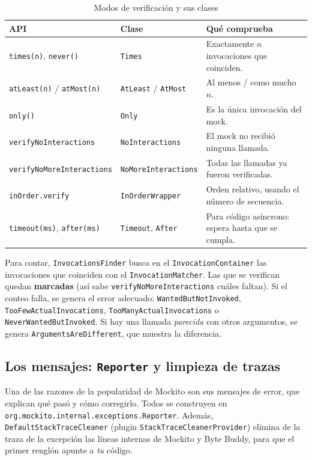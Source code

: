 \documentclass[11pt,a4paper,oneside]{report}
\newcommand{\code}[1]{\texttt{#1}}
\begin{document}
\begin{table}[H]
\centering
\caption{Modos de verificación y sus clases}
\begin{tabularx}{\linewidth}{llX}
\toprule
\textbf{API} & \textbf{Clase} & \textbf{Qué comprueba}\\
\midrule
\code{times(n)}, \code{never()} & \code{Times} & Exactamente $n$ invocaciones que coinciden.\\
\code{atLeast(n)} / \code{atMost(n)} & \code{AtLeast} / \code{AtMost} & Al menos / como mucho $n$.\\
\code{only()} & \code{Only} & Es la única invocación del mock.\\
\code{verifyNoInteractions} & \code{NoInteractions} & El mock no recibió ninguna llamada.\\
\code{verifyNoMoreInteractions} & \code{NoMoreInteractions} & Todas las llamadas ya fueron verificadas.\\
\code{inOrder.verify} & \code{InOrderWrapper} & Orden relativo, usando el número de secuencia.\\
\code{timeout(ms)}, \code{after(ms)} & \code{Timeout}, \code{After} & Para código asíncrono: espera hasta que se cumpla.\\
\bottomrule
\end{tabularx}
\end{table}

Para contar, \code{InvocationsFinder} busca en el \code{InvocationContainer} las invocaciones que coinciden con el \code{InvocationMatcher}. Las que se verifican quedan \textbf{marcadas} (así sabe \code{verifyNoMoreInteractions} cuáles faltan). Si el conteo falla, se genera el error adecuado: \code{WantedButNotInvoked}, \code{TooFewActualInvocations}, \code{TooManyActualInvocations} o \code{NeverWantedButInvoked}. Si hay una llamada \emph{parecida} con otros argumentos, se genera \code{ArgumentsAreDifferent}, que muestra la diferencia.

\subsection{Los mensajes: \code{Reporter} y limpieza de trazas}
Una de las razones de la popularidad de Mockito son sus mensajes de error, que explican qué pasó y cómo corregirlo. Todos se construyen en \code{org.mockito.internal.exceptions.Reporter}. Además, \code{DefaultStackTraceCleaner} (plugin \code{StackTraceCleanerProvider}) elimina de la traza de la excepción las líneas internas de Mockito y Byte Buddy, para que el primer renglón apunte a \emph{tu} código.
\end{document}
